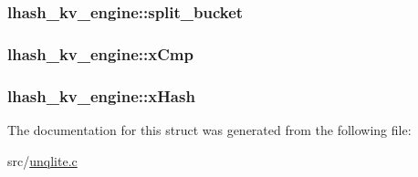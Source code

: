 \hypertarget{structlhash__kv__engine_a778d6dc601441feb7c3837e315f70e0a}{
\subsubsection[{split\-\_\-bucket}]{ lhash\-\_\-kv\-\_\-engine\-::split\-\_\-bucket}}\label{d8/d58/structlhash__kv__engine_a778d6dc601441feb7c3837e315f70e0a}
\hypertarget{structlhash__kv__engine_af54b44cf922d2a7a0e533bb6280847df}{
\subsubsection[{x\-Cmp}]{ lhash\-\_\-kv\-\_\-engine\-::x\-Cmp}}\label{d8/d58/structlhash__kv__engine_af54b44cf922d2a7a0e533bb6280847df}
\hypertarget{structlhash__kv__engine_a5df0b510750d1928071b1c42eaaed6ec}{
\subsubsection[{x\-Hash}]{ lhash\-\_\-kv\-\_\-engine\-::x\-Hash}}\label{d8/d58/structlhash__kv__engine_a5df0b510750d1928071b1c42eaaed6ec}


The documentation for this struct was generated from the following file\-:\begin{DoxyCompactItemize}
\item 
src/\hyperlink{unqlite_8c}{unqlite.\-c}\end{DoxyCompactItemize}
